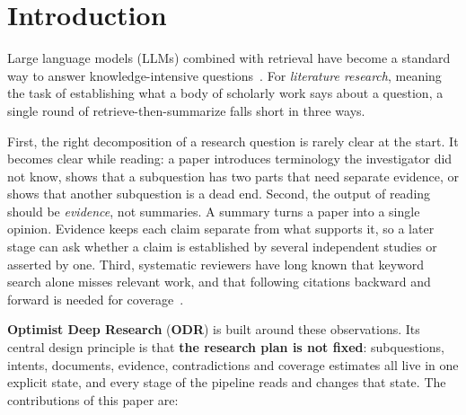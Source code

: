 \documentclass[10pt,a4paper]{article}
\newcommand{\hfont}{\sffamily}
\newcommand{\sys}{{\hfont\bfseries ODR}}
\newcommand{\sysfull}{{\hfont\bfseries Optimist Deep Research}}
\begin{document}
\section{Introduction}

Large language models (LLMs) combined with retrieval have become a standard way to answer knowledge-intensive questions~\citep{lewis2020rag}. For \emph{literature research}, meaning the task of establishing what a body of scholarly work says about a question, a single round of retrieve-then-summarize falls short in three ways.

First, the right decomposition of a research question is rarely clear at the start. It becomes clear while reading: a paper introduces terminology the investigator did not know, shows that a subquestion has two parts that need separate evidence, or shows that another subquestion is a dead end. Second, the output of reading should be \emph{evidence}, not summaries. A summary turns a paper into a single opinion. Evidence keeps each claim separate from what supports it, so a later stage can ask whether a claim is established by several independent studies or asserted by one. Third, systematic reviewers have long known that keyword search alone misses relevant work, and that following citations backward and forward is needed for coverage~\citep{wohlin2014guidelines,kitchenham2004procedures}.

\sysfull{} (\sys{}) is built around these observations. Its central design principle is
that \textbf{the research plan is not fixed}: subquestions, intents,
documents, evidence, contradictions and coverage estimates all live in one
explicit state, and every stage of the pipeline reads and changes that
state. The contributions of this paper are:
\end{document}
